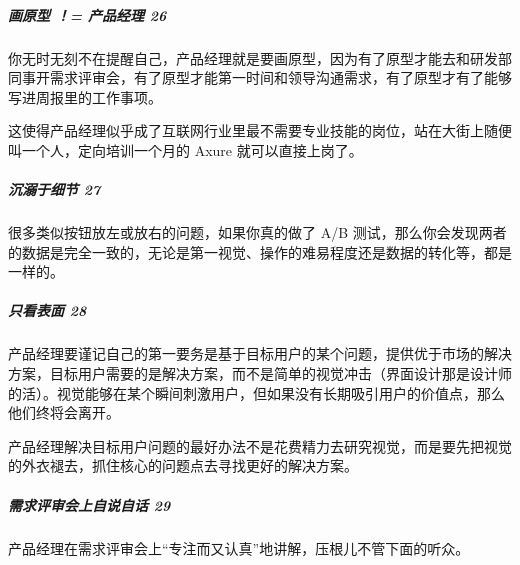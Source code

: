 \documentclass[letterpaper,10pt,english]{sphinxmanual}
\begin{document}
\begin{center}\end{center} 


\subparagraph{画原型 ！= 产品经理 26\sphinxfootnotemark[172]}
\label{\detokenize{chapter_introduction/PM:id9}}%
\begin{footnotetext}[172]\sphinxAtStartFootnote
{}
%
\end{footnotetext}\ignorespaces 
你无时无刻不在提醒自己，产品经理就是要画原型，因为有了原型才能去和研发部同事开需求评审会，有了原型才能第一时间和领导沟通需求，有了原型才有了能够写进周报里的工作事项。

这使得产品经理似乎成了互联网行业里最不需要专业技能的岗位，站在大街上随便叫一个人，定向培训一个月的
Axure 就可以直接上岗了。


\subparagraph{沉溺于细节 27\sphinxfootnotemark[173]}
\label{\detokenize{chapter_introduction/PM:id10}}%
\begin{footnotetext}[173]\sphinxAtStartFootnote
{}
%
\end{footnotetext}\ignorespaces 
很多类似按钮放左或放右的问题，如果你真的做了 A/B
测试，那么你会发现两者的数据是完全一致的，无论是第一视觉、操作的难易程度还是数据的转化等，都是一样的。


\subparagraph{只看表面 28\sphinxfootnotemark[174]}
\label{\detokenize{chapter_introduction/PM:id11}}%
\begin{footnotetext}[174]\sphinxAtStartFootnote
{}
%
\end{footnotetext}\ignorespaces 
产品经理要谨记自己的第一要务是基于目标用户的某个问题，提供优于市场的解决方案，目标用户需要的是解决方案，而不是简单的视觉冲击（界面设计那是设计师的活）。视觉能够在某个瞬间刺激用户，但如果没有长期吸引用户的价值点，那么他们终将会离开。

产品经理解决目标用户问题的最好办法不是花费精力去研究视觉，而是要先把视觉的外衣褪去，抓住核心的问题点去寻找更好的解决方案。


\subparagraph{需求评审会上自说自话 29\sphinxfootnotemark[175]}
\label{\detokenize{chapter_introduction/PM:id12}}%
\begin{footnotetext}[175]\sphinxAtStartFootnote
{}
%
\end{footnotetext}\ignorespaces 
产品经理在需求评审会上“专注而又认真”地讲解，压根儿不管下面的听众。
\end{document}
